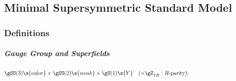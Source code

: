 
\def\uL{u\s L{}}%
\def\dL{d\s L{}}
\def\eL{e\s L{}}
\def\eR{e\s R{}}
\def\uR{u\s R{}}
\def\dR{d\s R{}}

\def\bQ{{\bar Q}}
\def\bL{{\bar L}}
\def\bU{{\bar U}}
\def\bD{{\bar D}}
\def\bE{{\bar E}}
\def\rMPL{M^{\rm R}\s{pl}}

\newcommand\sqL{\tilde q}    \newcommand\slL{\tilde l}    \newcommand\suR{\tilde u\s R}
\newcommand\suL{\tilde u\s L}\newcommand\snu{\tilde \nu}  \newcommand\sdR{\tilde d\s R}
\newcommand\sdL{\tilde d\s L}\newcommand\seL{\tilde e\s L}\newcommand\seR{\tilde e\s R}
\renewcommand\Hu {H\s u}    \renewcommand\Hd {H\s d}
\renewcommand\HuP{H\s u^+{}}\renewcommand\HdZ{H\s d^0{}}
\renewcommand\HuZ{H\s u^0{}}\renewcommand\HdM{H\s d^-{}}

\newcommand\Uc{U\suprm c}\newcommand\bUc{\bar U\suprm c}
\newcommand\Dc{D\suprm c}\newcommand\bDc{\bar D\suprm c}
\newcommand\Ec{E\suprm c}\newcommand\bEc{\bar E\suprm c}

\newcommand\Hnou{\tilde h\s u}     \newcommand\Hnod{\tilde h\s d}     \newcommand\bno{\tilde b}
\newcommand\HnouP{\tilde h\s u^+{}}\newcommand\HnodZ{\tilde h\s d^0{}}\newcommand\wno{\tilde w}
\newcommand\HnouZ{\tilde h\s u^0{}}\newcommand\HnodM{\tilde h\s d^-{}}\newcommand\gno{\tilde g}
\newcommand\bHnou{\bar{\tilde h}\s u{}}   \newcommand\bHnod{\bar{\tilde h}\s d{}}   \newcommand\bbno{\bar{\tilde b}{}}
\newcommand\bHnouP{\bar{\tilde h}{}\s u^+}\newcommand\bHnodZ{\bar{\tilde h}{}\s d^0}\newcommand\bwno{\bar{\tilde w}{}}
\newcommand\bHnouZ{\bar{\tilde h}{}\s u^0}\newcommand\bHnodM{\bar{\tilde h}{}\s d^-}\newcommand\bgno{\bar{\tilde g}{}}

\subsection{Minimal Supersymmetric Standard Model}
\subsubsection{Definitions}
\subparagraph[Gauge Group and Superfields]{Gauge Group and Superfields\footnotemark}
\begin{equation}
\gSU(3)\s{color}\times\gSU(2)\s{weak}\times\gU(1)\s{Y}\quad(\times{\gZ_2}_R\text{\ :\ $R$-parity});
\hspace{130pt}
\end{equation}

